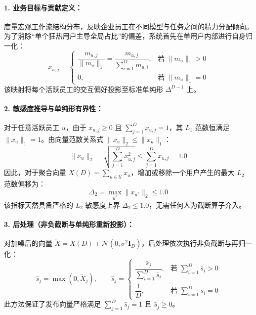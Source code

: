\paragraph{1. 业务目标与贡献定义：}
度量宏观工作流结构分布，反映企业员工在不同模型与任务之间的精力分配倾向。为了消除“单个狂热用户主导全局占比”的偏差，系统首先在单用户内部进行自身归一化：
\begin{equation}
  x_{u, j} = \begin{cases}
    \dfrac{m_{u, j}}{\|m_u\|_1} = \dfrac{m_{u, j}}{\sum_{i=1}^D m_{u, i}}, & \text{若 } \|m_u\|_1 > 0 \\[8pt]
    0, & \text{若 } \|m_u\|_1 = 0
  \end{cases}
\end{equation}
该映射将每个活跃员工的交互偏好投影至标准单纯形 $\Delta^{D-1}$ 上。

\paragraph{2. 敏感度推导与单纯形有界性：}
对于任意活跃员工 $u$，由于 $x_{u, j} \ge 0$ 且 $\sum_{j=1}^D x_{u, j} = 1$，其 $L_1$ 范数恒满足 $\|x_u\|_1 = 1$。由向量范数关系式 $\|x_u\|_2 \le \|x_u\|_1$：
\begin{equation}
  \|x_u\|_2 = \sqrt{\sum_{j=1}^D x_{u, j}^2} \le \sum_{j=1}^D x_{u, j} = 1.0
\end{equation}
因此，对于聚合向量 $X(D) = \sum_{u \in \mathcal{U}} x_u$，增加或移除一个用户产生的最大 $L_2$ 范数偏移为：
\begin{equation}
  \Delta_2 = \max_{u^*} \|x_{u^*}\|_2 \le 1.0
\end{equation}
该指标天然具备严格的 $L_2$ 敏感度上界 $\Delta_2 \le 1.0$，无需任何人为截断算子介入。

\paragraph{3. 后处理（非负截断与单纯形重新投影）：}
对加噪后的向量 $\tilde{X} = X(D) + \mathcal{N}(0, \sigma^2 \mathbf{I}_D)$，后处理依次执行非负截断与再归一化：
\begin{equation}
  \bar{s}_j = \max(0, \tilde{X}_j), \qquad \hat{s}_j = \begin{cases}
    \dfrac{\bar{s}_j}{\sum_{i=1}^D \bar{s}_i}, & \text{若 } \sum_{i=1}^D \bar{s}_i > 0 \\[8pt]
    \dfrac{1}{D}, & \text{若 } \sum_{i=1}^D \bar{s}_i = 0
  \end{cases}
\end{equation}
此方法保证了发布向量严格满足 $\sum_{j=1}^D \hat{s}_j = 1$ 且 $\hat{s}_j \ge 0$。

